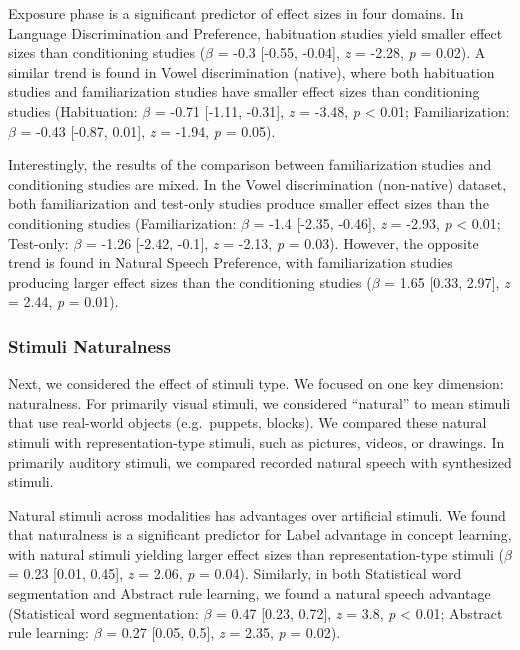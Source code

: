 \documentclass[10pt, letterpaper]{article}
\begin{document}
Exposure phase is a significant predictor of effect sizes in four
domains. In Language Discrimination and Preference, habituation studies
yield smaller effect sizes than conditioning studies (\(\beta\) = -0.3
{[}-0.55, -0.04{]}, \emph{z} = -2.28, \emph{p} = 0.02). A similar trend
is found in Vowel discrimination (native), where both habituation
studies and familiarization studies have smaller effect sizes than
conditioning studies (Habituation: \(\beta\) = -0.71 {[}-1.11, -0.31{]},
\emph{z} = -3.48, \emph{p} \textless{} 0.01; Familiarization: \(\beta\)
= -0.43 {[}-0.87, 0.01{]}, \emph{z} = -1.94, \emph{p} = 0.05).

Interestingly, the results of the comparison between familiarization
studies and conditioning studies are mixed. In the Vowel discrimination
(non-native) dataset, both familiarization and test-only studies produce
smaller effect sizes than the conditioning studies (Familiarization:
\(\beta\) = -1.4 {[}-2.35, -0.46{]}, \emph{z} = -2.93, \emph{p}
\textless{} 0.01; Test-only: \(\beta\) = -1.26 {[}-2.42, -0.1{]},
\emph{z} = -2.13, \emph{p} = 0.03). However, the opposite trend is found
in Natural Speech Preference, with familiarization studies producing
larger effect sizes than the conditioning studies (\(\beta\) = 1.65
{[}0.33, 2.97{]}, \emph{z} = 2.44, \emph{p} = 0.01).

\hypertarget{stimuli-naturalness}{%
\subsubsection{Stimuli Naturalness}\label{stimuli-naturalness}}

Next, we considered the effect of stimuli type. We focused on one key
dimension: naturalness. For primarily visual stimuli, we considered
``natural'' to mean stimuli that use real-world objects (e.g.~puppets,
blocks). We compared these natural stimuli with representation-type
stimuli, such as pictures, videos, or drawings. In primarily auditory
stimuli, we compared recorded natural speech with synthesized stimuli.

Natural stimuli across modalities has advantages over artificial
stimuli. We found that naturalness is a significant predictor for Label
advantage in concept learning, with natural stimuli yielding larger
effect sizes than representation-type stimuli (\(\beta\) = 0.23 {[}0.01,
0.45{]}, \emph{z} = 2.06, \emph{p} = 0.04). Similarly, in both
Statistical word segmentation and Abstract rule learning, we found a
natural speech advantage (Statistical word segmentation: \(\beta\) =
0.47 {[}0.23, 0.72{]}, \emph{z} = 3.8, \emph{p} \textless{} 0.01;
Abstract rule learning: \(\beta\) = 0.27 {[}0.05, 0.5{]}, \emph{z} =
2.35, \emph{p} = 0.02).
\end{document}
